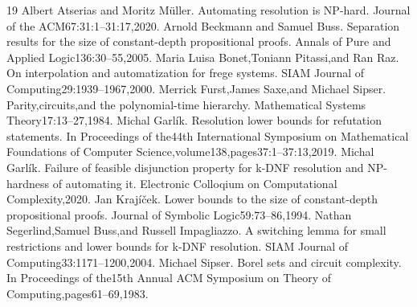 \begin{thebibliography}{19}
 Albert Atserias and Moritz M\"uller. Automating resolution is NP-hard. Journal of the ACM67:31:1--31:17,2020.
 Arnold Beckmann and Samuel Buss. Separation results for the size of constant-depth propositional proofs. Annals of Pure and Applied Logic136:30--55,2005.
 Maria Luisa Bonet,Toniann Pitassi,and Ran Raz. On interpolation and automatization for frege systems. SIAM Journal of Computing29:1939--1967,2000.
 Merrick Furst,James Saxe,and Michael Sipser. Parity,circuits,and the polynomial-time hierarchy. Mathematical Systems Theory17:13--27,1984.
 Michal Garl\'ik. Resolution lower bounds for refutation statements. In Proceedings of the44th International Symposium on Mathematical Foundations of Computer Science,volume138,pages37:1--37:13,2019.
 Michal Garl\'ik. Failure of feasible disjunction property for k-DNF resolution and NP-hardness of automating it. Electronic Colloqium on Computational Complexity,2020.
 Jan Kraj\'i\v{c}ek. Lower bounds to the size of constant-depth propositional proofs. Journal of Symbolic Logic59:73--86,1994.
 Nathan Segerlind,Samuel Buss,and Russell Impagliazzo. A switching lemma for small restrictions and lower bounds for k-DNF resolution. SIAM Journal of Computing33:1171--1200,2004.
 Michael Sipser. Borel sets and circuit complexity. In Proceedings of the15th Annual ACM Symposium on Theory of Computing,pages61--69,1983.
\end{thebibliography}

